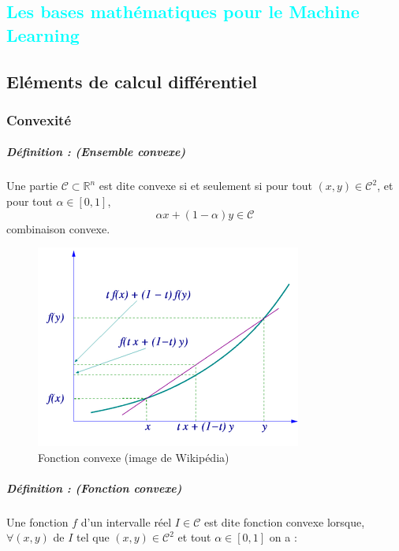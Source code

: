 \textcolor{cyan}{\chapter{Les bases mathématiques pour le Machine Learning}}
	\section{Eléments de calcul différentiel}
	\subsection{Convexité}
		\paragraph*{Définition : (Ensemble convexe)} 
		Une partie $\mathcal{C} \subset \mathbb{R}^n $ est dite convexe si et seulement si pour tout $(x,y) \in \mathcal{C}^2$, 
		et pour tout $ \alpha \in [0, 1]$,
		$$ \alpha x + (1 - \alpha)y \in \mathcal{C}$$ combinaison convexe.
		\begin{figure}
			\centering
			\includegraphics{images/convex_function_graph.png}
			\caption{Fonction convexe (image de Wikipédia)}
			\label{convexe_graph}
		\end{figure}
		\paragraph*{Définition : (Fonction convexe)}
		Une fonction $f$ d'un intervalle réel $I \in \mathcal{C}$ est dite fonction convexe lorsque, $\forall (x,y)$ de $I$ tel que $(x,y) \in \mathcal{C}^2$ et tout $\alpha \in [0, 1]$ on a :
		
				

